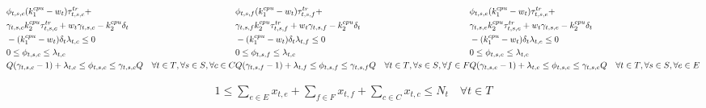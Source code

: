 \documentclass[conference]{IEEEtran}
\begin{document}
    \begin{subequations}
      \begin{align}
        &\notag\phi_{t,s,c}(k_1^{cpu}-w_t)\tau^{tr}_{t,s,c} + \\ &\notag\gamma_{t,s,c}k_2^{cpu}\tau_{t,s,c}^{tr}+w_t\gamma_{t,s,c}-k_2^{cpu}\delta_t \\ &-(k_1^{cpu}-w_t)\delta_t\lambda_{t,c} \le 0 \\
        &0 \le \phi_{t,s,c} \le \lambda_{t,c} \\
        &Q(\gamma_{t,s,c}-1)+\lambda_{t,c} \le \phi_{t,s,c} \le \gamma_{t,s,c}Q \quad \forall{t \in T}, \forall{s \in S}, \forall{c \in C}
      \end{align}
      \begin{align}
        &\notag\phi_{t,s,f}(k_1^{cpu}-w_t)\tau^{tr}_{t,s,f} + \\ &\notag\gamma_{t,s,f}k_2^{cpu}\tau_{t,s,f}^{tr}+w_t\gamma_{t,s,f}-k_2^{cpu}\delta_t \\ &-(k_1^{cpu}-w_t)\delta_t\lambda_{t,f} \le 0 \\
        &0 \le \phi_{t,s,f} \le \lambda_{t,c} \\
        &Q(\gamma_{t,s,f}-1)+\lambda_{t,f} \le \phi_{t,s,f} \le \gamma_{t,s,f}Q \quad \forall{t \in T}, \forall{s \in S}, \forall{f \in F}
      \end{align}
      \begin{align}
        &\notag\phi_{t,s,e}(k_1^{cpu}-w_t)\tau^{tr}_{t,s,e} + \\ &\notag\gamma_{t,s,e}k_2^{cpu}\tau_{t,s,e}^{tr}+w_t\gamma_{t,s,e}-k_2^{cpu}\delta_t \\ &-(k_1^{cpu}-w_t)\delta_t\lambda_{t,e} \le 0 \\
        &0 \le \phi_{t,s,e} \le \lambda_{t,e} \\
        &Q(\gamma_{t,s,e}-1)+\lambda_{t,e} \le \phi_{t,s,e} \le \gamma_{t,s,e}Q \quad \forall{t \in T}, \forall{s \in S}, \forall{e \in E}
      \end{align}
    \end{subequations}

    \begin{subequations}
      \begin{align}
        1 \le \sum_{e \in E}x_{t,e} + \sum_{f \in F}x_{t,f} + \sum_{c \in C}x_{t,c} \le N_t \quad \forall{t \in T}
      \end{align}
    \end{subequations}
\end{document}
